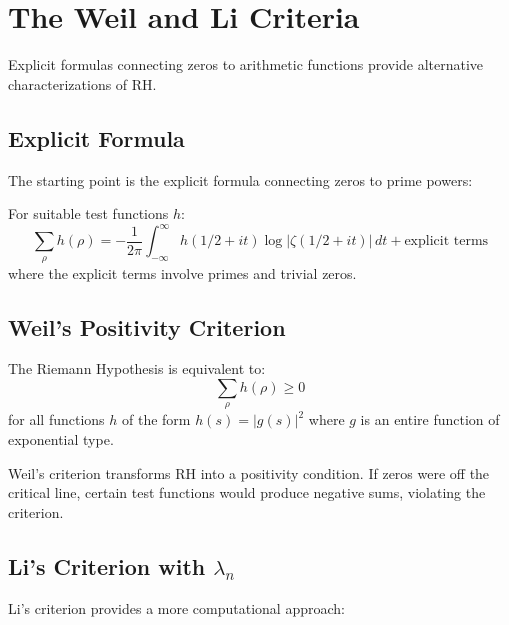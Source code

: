 \section{The Weil and Li Criteria}

Explicit formulas connecting zeros to arithmetic functions provide alternative characterizations of RH.

\subsection{Explicit Formula}

The starting point is the explicit formula connecting zeros to prime powers:

\begin{theorem}
For suitable test functions $h$:
\begin{equation}
\sum_{\rho} h(\rho) = -\frac{1}{2\pi} \int_{-\infty}^{\infty} h(1/2 + it) \log|\zeta(1/2 + it)| \, dt + \text{explicit terms}
\end{equation}
where the explicit terms involve primes and trivial zeros.
\end{theorem}

\subsection{Weil's Positivity Criterion}

\begin{theorem}
The Riemann Hypothesis is equivalent to:
\begin{equation}
\sum_{\rho} h(\rho) \geq 0
\end{equation}
for all functions $h$ of the form $h(s) = |g(s)|^2$ where $g$ is an entire function of exponential type.
\end{theorem}

\begin{remark}[Intuition]
Weil's criterion transforms RH into a positivity condition. If zeros were off the critical line, certain test functions would produce negative sums, violating the criterion.
\end{remark}

\subsection{Li's Criterion with $\lambda_n$}

Li's criterion provides a more computational approach:


